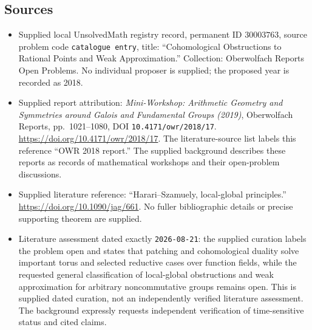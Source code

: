 \documentclass[11pt]{article}
\begin{document}
\subsection{Sources}
\begin{itemize}
\item Supplied local UnsolvedMath registry record, permanent ID \(30003763\), source problem code \texttt{catalogue entry}, title: ``Cohomological Obstructions to Rational Points and Weak Approximation.'' Collection: Oberwolfach Reports Open Problems. No individual proposer is supplied; the proposed year is recorded as 2018.
\item Supplied report attribution: \emph{Mini-Workshop: Arithmetic Geometry and Symmetries around Galois and Fundamental Groups (2019)}, Oberwolfach Reports, pp.\ 1021--1080, DOI \texttt{10.4171/owr/2018/17}. \url{https://doi.org/10.4171/owr/2018/17}. The literature-source list labels this reference ``OWR 2018 report.'' The supplied background describes these reports as records of mathematical workshops and their open-problem discussions.
\item Supplied literature reference: ``Harari--Szamuely, local-global principles.'' \url{https://doi.org/10.1090/jag/661}. No fuller bibliographic details or precise supporting theorem are supplied.
\item Literature assessment dated exactly \texttt{2026-08-21}: the supplied curation labels the problem open and states that patching and cohomological duality solve important torus and selected reductive cases over function fields, while the requested general classification of local-global obstructions and weak approximation for arbitrary noncommutative groups remains open. This is supplied dated curation, not an independently verified literature assessment. The background expressly requests independent verification of time-sensitive status and cited claims.
\end{itemize}
\end{document}
